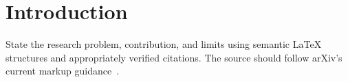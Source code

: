 \section{Introduction}

State the research problem, contribution, and limits using semantic LaTeX
structures and appropriately verified citations. The source should follow
arXiv's current markup guidance~\cite{arxiv-latex-best-practices}.
